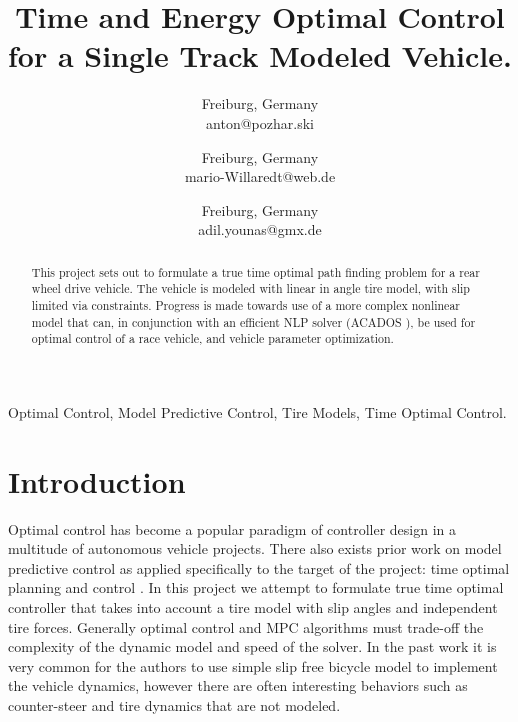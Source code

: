 \documentclass[conference,11pt]{IEEEtran}
\begin{document}
\title{Time and Energy Optimal Control for a Single Track Modeled Vehicle.}

\author{
Freiburg, Germany \\
anton@pozhar.ski
\and
{}
Freiburg, Germany \\
mario-Willaredt@web.de
\and
{}
Freiburg, Germany \\
adil.younas@gmx.de
}

\maketitle

\begin{abstract}
  This project sets out to formulate a true time optimal path finding problem for a rear wheel drive vehicle. The vehicle is modeled with linear in angle tire model, with slip limited via constraints.
  Progress is made towards use of a more complex nonlinear model that can, in conjunction with an efficient NLP solver (ACADOS \cite{Verschueren2021}), be used for optimal control of a race vehicle,
  and vehicle parameter optimization.
\end{abstract}

\begin{IEEEkeywords}
Optimal Control, Model Predictive Control, Tire Models, Time Optimal Control.
\end{IEEEkeywords}

\section{Introduction}
Optimal control has become a popular paradigm of controller design in a multitude of autonomous vehicle projects. There also exists prior work on model predictive control as applied specifically
to the target of the project: time optimal planning and control \cite{Verschueren2014a}\cite{LOT20147559}. In this project we attempt to formulate true time optimal controller that takes into
account a tire model with slip angles and independent tire forces. Generally optimal control and MPC algorithms must trade-off the complexity of the dynamic model and speed of the solver. In the
past work it is very common for the authors to use simple slip free bicycle model to implement the vehicle dynamics, however there are often interesting behaviors such as counter-steer and tire
dynamics that are not modeled.
\end{document}
